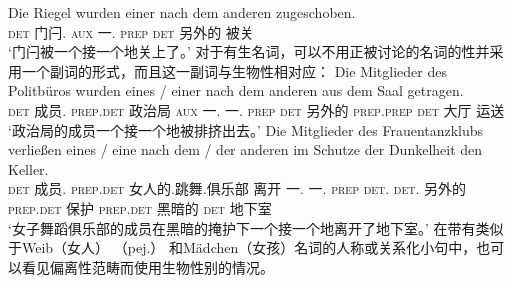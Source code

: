 \ex 
\gll Die Riegel wurden einer nach dem anderen zugeschoben.\\
	 \textsc{det} 门闩.\mas{} \textsc{aux} 一.\mas{} \textsc{prep} \textsc{det} 另外的 被关\\
\glt `门闩被一个接一个地关上了。'
\zl
对于有生名词，可以不用正被讨论的名词的性并采用一个副词的形式，而且这一副词与生物性相对应：
\eal
\ex 
\gll Die Mitglieder des Politbüros wurden eines / einer nach dem anderen aus dem Saal getragen.\\
	 \textsc{det} 成员.\neu{} \textsc{prep}.\textsc{det} 政治局 \textsc{aux} 一.\neu{} {} 一.\mas{} \textsc{prep} \textsc{det} 另外的 \textsc{prep}.\textsc{prep} \textsc{det} 大厅 运送\\
\glt `政治局的成员一个接一个地被排挤出去。'
\ex 
\gll Die Mitglieder des Frauentanzklubs verließen eines / eine nach dem / der anderen im Schutze der Dunkelheit den
Keller.\\
\textsc{det} 成员.\neu{} \textsc{prep}.\textsc{det} 女人的.跳舞.俱乐部 离开 一.\neu{} {} 一.\fem{} \textsc{prep} \textsc{det}.\neu{} {} \textsc{det}.\fem{} 另外的 \textsc{prep}.\textsc{det} 保护 \textsc{prep}.\textsc{det} 黑暗的 \textsc{det}
地下室\\
\glt `女子舞蹈俱乐部的成员在黑暗的掩护下一个接一个地离开了地下室。'
\zl
在带有类似于Weib（女人） （pej.） 和Mädchen（女孩）名词的人称或关系化小句中，也可以看见偏离性范畴而使用生物性别的情况。
